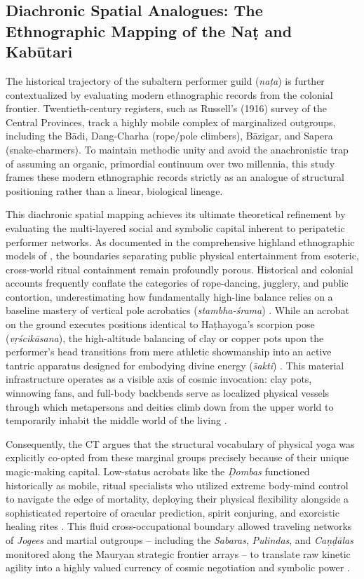 \documentclass[11pt,twoside,letterpaper]{article}
\begin{document}
\subsection{Diachronic Spatial Analogues: The Ethnographic Mapping of the Naṭ and Kabūtari}
The historical trajectory of the subaltern performer guild (\textit{naṭa}) is further contextualized by evaluating modern ethnographic records from the colonial frontier. Twentieth-century registers, such as Russell’s (1916) survey of the Central Provinces, track a highly mobile complex of marginalized outgroups, including the Bādi, Dang-Charha (rope/pole climbers), Bāzigar, and Sapera (snake-charmers). To maintain methodic unity and avoid the anachronistic trap of assuming an organic, primordial continuum over two millennia, this study frames these modern ethnographic records strictly as an analogue of structural positioning rather than a linear, biological lineage.

This diachronic spatial mapping achieves its ultimate theoretical refinement by evaluating the multi-layered social and symbolic capital inherent to peripatetic performer networks. As documented in the comprehensive highland ethnographic models of \citet{Berger2023}, the boundaries separating public physical entertainment from esoteric, cross-world ritual containment remain profoundly porous. Historical and colonial accounts frequently conflate the categories of rope-dancing, jugglery, and public contortion, underestimating how fundamentally high-line balance relies on a baseline mastery of vertical pole acrobatics (\textit{stambha-śrama}) \citep{Berger2023}. While an acrobat on the ground executes positions identical to Haṭhayoga's scorpion pose (\textit{vṛścikāsana}), the high-altitude balancing of clay or copper pots upon the performer’s head transitions from mere athletic showmanship into an active tantric apparatus designed for embodying divine energy (\textit{s̄akti}) \citep{Berger2023}. This material infrastructure operates as a visible axis of cosmic invocation: clay pots, winnowing fans, and full-body backbends serve as localized physical vessels through which metapersons and deities climb down from the upper world to temporarily inhabit the middle world of the living \citep[397]{Berger2023}. 

Consequently, the CT argues that the structural vocabulary of physical yoga was explicitly co-opted from these marginal groups precisely because of their unique magic-making capital. Low-status acrobats like the \textit{Ḍombas} functioned historically as mobile, ritual specialists who utilized extreme body-mind control to navigate the edge of mortality, deploying their physical flexibility alongside a sophisticated repertoire of oracular prediction, spirit conjuring, and exorcistic healing rites \citep{Berger2023, Olivelle2011}. This fluid cross-occupational boundary allowed traveling networks of \textit{Jogees} and martial outgroups -- including the \textit{S̄abaras}, \textit{Pulindas}, and \textit{Caṇḍālas} monitored along the Mauryan strategic frontier arrays -- to translate raw kinetic agility into a highly valued currency of cosmic negotiation and symbolic power \citep{Kangle1969}. 
\end{document}
